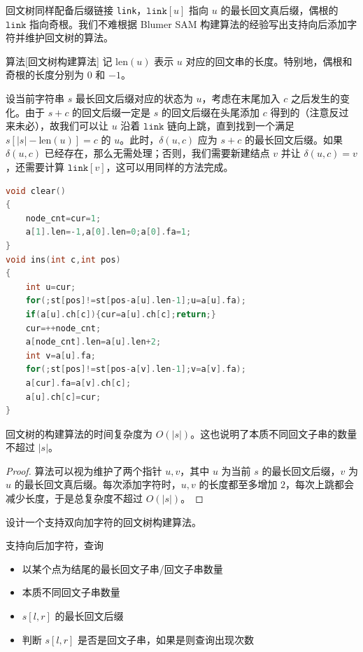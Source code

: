 回文树同样配备后缀链接 \texttt{link}，$\mathtt{link}[u]$ 指向 $u$ 的最长回文真后缀，偶根的 $\mathtt{link}$ 指向奇根。我们不难根据 Blumer SAM 构建算法的经验写出支持向后添加字符并维护回文树的算法。

\begin{descbox}{算法}[回文树构建算法]
    记 $\mathrm{len}(u)$ 表示 $u$ 对应的回文串的长度。特别地，偶根和奇根的长度分别为 $0$ 和 $-1$。
    
    设当前字符串 $s$ 最长回文后缀对应的状态为 $u$，考虑在末尾加入 $c$ 之后发生的变化。由于 $s+c$ 的回文后缀一定是 $s$ 的回文后缀在头尾添加 $c$ 得到的（注意反过来未必），故我们可以让 $u$ 沿着 $\mathtt{link}$ 链向上跳，直到找到一个满足 $s[|s|-\mathrm{len}(u)]=c$ 的 $u$。此时，$\delta(u,c)$ 应为 $s+c$ 的最长回文后缀。如果 $\delta(u,c)$ 已经存在，那么无需处理；否则，我们需要新建结点 $v$ 并让 $\delta(u,c)=v$，还需要计算 $\mathtt{link}[v]$，这可以用同样的方法完成。
\end{descbox}
\begin{lstlisting}[language=C++, caption=回文树构建算法]
void clear()
{
	node_cnt=cur=1;
	a[1].len=-1,a[0].len=0;a[0].fa=1;
}
void ins(int c,int pos)
{
	int u=cur;
	for(;st[pos]!=st[pos-a[u].len-1];u=a[u].fa);
	if(a[u].ch[c]){cur=a[u].ch[c];return;}
	cur=++node_cnt;
	a[node_cnt].len=a[u].len+2;
	int v=a[u].fa;
	for(;st[pos]!=st[pos-a[v].len-1];v=a[v].fa);
	a[cur].fa=a[v].ch[c];
	a[u].ch[c]=cur;
}
\end{lstlisting}

\begin{theorem}
    回文树的构建算法的时间复杂度为 $O(|s|)$。这也说明了本质不同回文子串的数量不超过 $|s|$。
\end{theorem}
\begin{proof}
    算法可以视为维护了两个指针 $u,v$，其中 $u$ 为当前 $s$ 的最长回文后缀，$v$ 为 $u$ 的最长回文真后缀。每次添加字符时，$u,v$ 的长度都至多增加 $2$，每次上跳都会减少长度，于是总复杂度不超过 $O(|s|)$。
\end{proof}

\begin{exercise}
    设计一个支持双向加字符的回文树构建算法。
\end{exercise}

\begin{exercise}
    支持向后加字符，查询
    \begin{itemize}
        \item 以某个点为结尾的最长回文子串/回文子串数量
        \item 本质不同回文子串数量
        \item $s[l,r]$ 的最长回文后缀
        \item 判断 $s[l,r]$ 是否是回文子串，如果是则查询出现次数
    \end{itemize}
\end{exercise}

